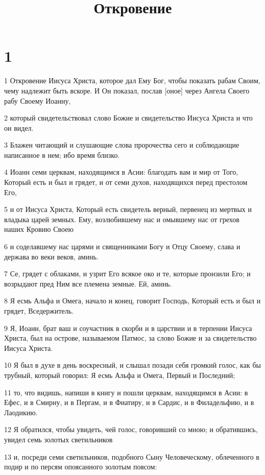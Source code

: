 

\title{Откровение}


\chapter{1}

\par 1 Откровение Иисуса Христа, которое дал Ему Бог, чтобы показать рабам Своим, чему надлежит быть вскоре. И Он показал, послав [оное] через Ангела Своего рабу Своему Иоанну,
\par 2 который свидетельствовал слово Божие и свидетельство Иисуса Христа и что он видел.
\par 3 Блажен читающий и слушающие слова пророчества сего и соблюдающие написанное в нем; ибо время близко.
\par 4 Иоанн семи церквам, находящимся в Асии: благодать вам и мир от Того, Который есть и был и грядет, и от семи духов, находящихся перед престолом Его,
\par 5 и от Иисуса Христа, Который есть свидетель верный, первенец из мертвых и владыка царей земных. Ему, возлюбившему нас и омывшему нас от грехов наших Кровию Своею
\par 6 и соделавшему нас царями и священниками Богу и Отцу Своему, слава и держава во веки веков, аминь.
\par 7 Се, грядет с облаками, и узрит Его всякое око и те, которые пронзили Его; и возрыдают пред Ним все племена земные. Ей, аминь.
\par 8 Я есмь Альфа и Омега, начало и конец, говорит Господь, Который есть и был и грядет, Вседержитель.
\par 9 Я, Иоанн, брат ваш и соучастник в скорби и в царствии и в терпении Иисуса Христа, был на острове, называемом Патмос, за слово Божие и за свидетельство Иисуса Христа.
\par 10 Я был в духе в день воскресный, и слышал позади себя громкий голос, как бы трубный, который говорил: Я есмь Альфа и Омега, Первый и Последний;
\par 11 то, что видишь, напиши в книгу и пошли церквам, находящимся в Асии: в Ефес, и в Смирну, и в Пергам, и в Фиатиру, и в Сардис, и в Филадельфию, и в Лаодикию.
\par 12 Я обратился, чтобы увидеть, чей голос, говоривший со мною; и обратившись, увидел семь золотых светильников
\par 13 и, посреди семи светильников, подобного Сыну Человеческому, облеченного в подир и по персям опоясанного золотым поясом:
